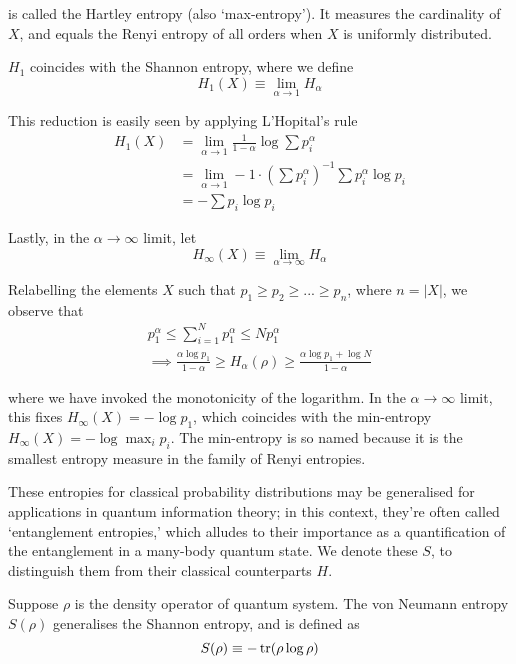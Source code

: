 \documentclass[10pt]{article}
\begin{document}
is called the Hartley entropy (also `max-entropy'). It measures the cardinality of $X$, and equals the Renyi entropy of all orders when $X$ is uniformly distributed. 

$H_1$ coincides with the Shannon entropy, where we define
\begin{equation}
H_1(X) \equiv \lim_{\alpha \rightarrow 1} H_\alpha
\end{equation}

This reduction is easily seen by applying L'Hopital's rule
\begin{align}
H_1(X)
&= \lim_{\alpha\rightarrow1} \frac{1}{1-\alpha} \log \sum p_i^\alpha \nonumber \\
&= \lim_{\alpha\rightarrow1} -1 \cdot \left(\sum p_i^\alpha\right)^{-1} \sum p_i^\alpha \log p_i \nonumber \\
&= - \sum p_i \log p_i
\end{align}

Lastly, in the $\alpha\rightarrow\infty$ limit, let
\begin{equation}
H_\infty(X) \equiv \lim_{\alpha \rightarrow \infty} H_\alpha
\end{equation}

Relabelling the elements $X$ such that $p_1 \geq p_2 \geq ... \geq p_n$, where $n=|X|$, we observe that
\begin{gather}
p_1^\alpha \leq \sum_{i=1}^N p_1^\alpha \leq N p_1^\alpha \nonumber \\
\implies
\frac{\alpha \log p_1}{1-\alpha} \geq H_\alpha(\rho) \geq \frac{\alpha \log p_1 + \log N}{1- \alpha}
\end{gather}

where we have invoked the monotonicity of the logarithm. In the $\alpha\rightarrow\infty$ limit, this fixes $H_\infty(X) = -\log p_1$, which coincides with the min-entropy $H_\infty(X) = - \log \max_i p_i$. The min-entropy is so named because it is the smallest entropy measure in the family of Renyi entropies.




These entropies for classical probability distributions may be generalised for applications in quantum information theory; in this context, they're often called `entanglement entropies,' which alludes to their importance as a quantification of the entanglement in a many-body quantum state. We denote these $S$, to distinguish them from their classical counterparts $H$. 

Suppose $\rho$ is the density operator of quantum system. The von Neumann entropy $S(\rho)$ generalises the Shannon entropy, and is defined as
\begin{equation}
S(\rho) \equiv - \trace(\rho \log \rho)
\end{equation}
\end{document}
